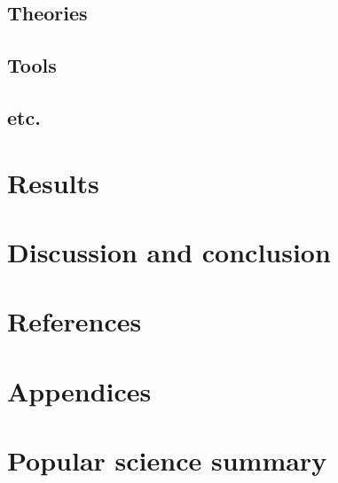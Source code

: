 \documentclass[a4paper,10pt]{article}
\begin{document}
  \subsection{Theories}
  \subsection{Tools}
  \subsection{etc.}
\section{Results}
\section{Discussion and conclusion}
\section{References}
\section{Appendices}
\section{Popular science summary}
\end{document}
